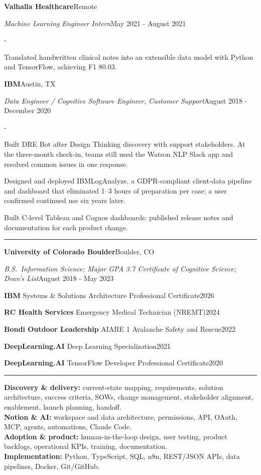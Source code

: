 \documentclass[10pt,letterpaper]{article}
\newenvironment{cvitems}{%
  \begin{list}{-}{%
    \setlength{\leftmargin}{12pt}%
    \setlength{\itemsep}{1.2pt}%
    \setlength{\parsep}{0pt}%
    \setlength{\topsep}{1.5pt}%
    \setlength{\partopsep}{0pt}%
    \setlength{\labelwidth}{6pt}%
    \setlength{\labelsep}{6pt}%
    \setlength{\itemindent}{0pt}%
  }%
}{\end{list}}
\newcommand{\cvsection}[1]{%
  \vspace{7pt}%
  \noindent{\bfseries\fontsize{11pt}{13pt}\selectfont\MakeUppercase{#1}}\par
  \vspace{1pt}%
  \noindent\rule{\textwidth}{0.4pt}\par
  \vspace{4pt}%
}
\newcommand{\cventryhead}[4]{%
  \noindent\textbf{#1}\hfill#2\par
  \vspace{0.5pt}%
  \noindent\textit{#3}\hfill#4\par
}
\newcommand{\cveduhead}[4]{%
  \noindent\textbf{#1}\hfill#2\par
  \vspace{0.5pt}%
  \noindent\textit{#3}\hfill#4\par
}
\newcommand{\cvcert}[3]{%
  \noindent\textbf{#1} \textbar{} #2\hfill#3\par
  \vspace{1pt}%
}
\begin{document}
\vspace{3pt}
\cventryhead{Valhalla Healthcare}{Remote}
{Machine Learning Engineer Intern}{May 2021 - August 2021}
\begin{cvitems}
  \item Translated handwritten clinical notes into an extensible data model with Python and TensorFlow, achieving F1 80.03.
\end{cvitems}

\vspace{3pt}
\cventryhead{IBM}{Austin, TX}
{Data Engineer / Cognitive Software Engineer, Customer Support}{August 2018 - December 2020}
\begin{cvitems}
  \item Built DRE Bot after Design Thinking discovery with support stakeholders. At the three-month check-in, teams still used the Watson NLP Slack app and resolved common issues in one response.
  \item Designed and deployed IBMLogAnalyze, a GDPR-compliant client-data pipeline and dashboard that eliminated 1--3 hours of preparation per case; a user confirmed continued use six years later.
  \item Built C-level Tableau and Cognos dashboards; published release notes and documentation for each product change.
\end{cvitems}

\cvsection{Education}

\cveduhead{University of Colorado Boulder}{Boulder, CO}
{B.S.\ Information Science; Major GPA 3.7 \textbar{} Certificate of Cognitive Science; Dean's List}{August 2018 - May 2023}

\vspace{4pt}
\cvcert{IBM}{Systems \& Solutions Architecture Professional Certificate}{2026}
\cvcert{RC Health Services}{Emergency Medical Technician (NREMT)}{2024}
\cvcert{Bondi Outdoor Leadership}{AIARE 1 Avalanche Safety and Rescue}{2022}
\cvcert{DeepLearning.AI}{Deep Learning Specialization}{2021}
\cvcert{DeepLearning.AI}{TensorFlow Developer Professional Certificate}{2020}

\cvsection{Skills}

{\raggedright
\noindent\textbf{Discovery \& delivery:} current-state mapping, requirements, solution architecture, success criteria, SOWs, change management, stakeholder alignment, enablement, launch planning, handoff.\\[2pt]
\noindent\textbf{Notion \& AI:} workspace and data architecture, permissions, API, OAuth, MCP, agents, automations, Claude Code.\\[2pt]
\noindent\textbf{Adoption \& product:} human-in-the-loop design, user testing, product backlogs, operational KPIs, training, documentation.\\[2pt]
\noindent\textbf{Implementation:} Python, TypeScript, SQL, n8n, REST/JSON APIs, data pipelines, Docker, Git/GitHub.\par
}
\end{document}
